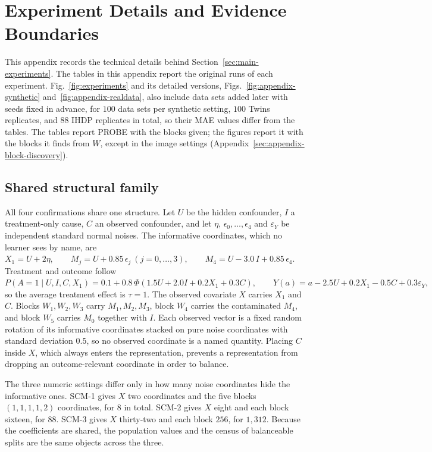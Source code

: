 \section{Experiment Details and Evidence Boundaries}
\label{sec:appendix-experiments}

This appendix records the technical details behind Section~\ref{sec:main-experiments}. The tables in this appendix report the original runs of each experiment. Fig.~\ref{fig:experiments} and its detailed versions, Figs.~\ref{fig:appendix-synthetic} and~\ref{fig:appendix-realdata}, also include data sets added later with seeds fixed in advance, for $100$ data sets per synthetic setting, $100$ Twins replicates, and $88$ IHDP replicates in total, so their MAE values differ from the tables. The tables report PROBE with the blocks given; the figures report it with the blocks it finds from $W$, except in the image settings (Appendix~\ref{sec:appendix-block-discovery}).

\subsection{Shared structural family}

All four confirmations share one structure. Let $U$ be the hidden confounder, $I$ a treatment-only cause, $C$ an observed confounder, and let $\eta$, $\epsilon_0,\ldots,\epsilon_4$ and $\varepsilon_Y$ be independent standard normal noises. The informative coordinates, which no learner sees by name, are
\(X_1=U+2\eta,\qquad M_j=U+0.85\,\epsilon_j\ (j=0,\ldots,3),\qquad M_4=U-3.0\,I+0.85\,\epsilon_4.\)
Treatment and outcome follow
\(P(A=1\mid U,I,C,X_1)=0.1+0.8\,\Phi(1.5U+2.0I+0.2X_1+0.3C),\qquad Y(a)=a-2.5U+0.2X_1-0.5C+0.3\varepsilon_Y,\)
so the average treatment effect is $\tau=1$. The observed covariate $X$ carries $X_1$ and $C$. Blocks $W_1,W_2,W_3$ carry $M_1,M_2,M_3$, block $W_4$ carries the contaminated $M_4$, and block $W_5$ carries $M_0$ together with $I$. Each observed vector is a fixed random rotation of its informative coordinates stacked on pure noise coordinates with standard deviation $0.5$, so no observed coordinate is a named quantity. Placing $C$ inside $X$, which always enters the representation, prevents a representation from dropping an outcome-relevant coordinate in order to balance.

The three numeric settings differ only in how many noise coordinates hide the informative ones. SCM-1 gives $X$ two coordinates and the five blocks $(1,1,1,1,2)$ coordinates, for $8$ in total. SCM-2 gives $X$ eight and each block sixteen, for $88$. SCM-3 gives $X$ thirty-two and each block $256$, for $1{,}312$. Because the coefficients are shared, the population values and the census of balanceable splits are the same objects across the three.

